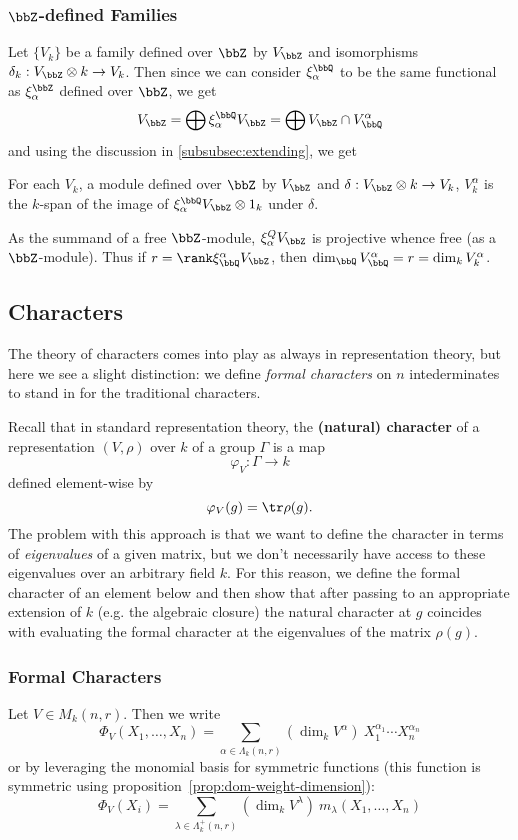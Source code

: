 \documentclass[12pt]{article}
\DeclareMathOperator{\1}{\mathbbm{1}}
\begin{document}
{\subsubsection{\texorpdfstring{$\bbZ$}{Z}-defined Families}
Let $\{V_k\}$ be a family defined over $\bbZ$ by $V_\bbZ$ and isomorphisms $\delta_k:V_\bbZ\otimes k\to V_k$. Then since we can consider $\xi_\alpha^\bbQ$ 
to be the same functional as $\xi_\alpha^\bbZ$ defined over $\bbZ$, we get 
\[V_\bbZ=\bigoplus \xi_\alpha^\bbQ V_\bbZ=\bigoplus V_\bbZ\cap V_\bbQ^\alpha\]
and using the discussion in \ref{subsubsec:extending}, we get 
\begin{prop}
	For each $V_k$, a module defined over $\bbZ$ by $V_\bbZ$ and $\delta:V_\bbZ\otimes k\to V_k$,
	$V_k^\alpha$ is the $k$-span of the image of $\xi_\alpha^\bbQ V_\bbZ\otimes 1_k$ under $\delta$.
\end{prop}
\begin{rmk}
	As the summand of a free $\bbZ$-module, $\xi_\alpha^Q V_\bbZ$ is projective whence free (as a $\bbZ$-module). Thus if $r=\rank \xi_\bbQ^\alpha V_\bbZ$, 
	then $\dim_\bbQ V_\bbQ^\alpha=r=\dim_k V_k^\alpha$.
\end{rmk}

\subsection{Characters}
The theory of characters comes into play as always in representation theory, but here we see a slight distinction:
we define \textit{formal characters} on $n$ intederminates to stand in for the traditional characters.

Recall that in standard representation theory, the \textbf{(natural) character} of a representation $(V,\rho)$ over $k$ of a group $\Gamma$ is a map 
\[\varphi_V:\Gamma\to k\]
defined element-wise by 
\[\varphi_V(g)=\tr \rho(g).\]
The problem with this approach is that we want to define the character in terms of \textit{eigenvalues} of a given matrix, 
but we don't necessarily have access to these eigenvalues over an arbitrary field $k$. For this reason, we define 
the formal character of an element below and then show that after passing to an appropriate extension of $k$ (e.g. the algebraic closure)
the natural character at $g$ coincides with evaluating the formal character at the eigenvalues of the matrix $\rho(g)$.

\subsubsection{Formal Characters}
Let $V\in M_k(n,r)$. Then we write 
\[\Phi_V(X_1,\dots, X_n)=\sum_{\alpha\in\Lambda_k(n,r)}(\dim_k V^\alpha) \ X_1^{\alpha_1}\cdots X_n^{\alpha_n}\]
or by leveraging the monomial basis for symmetric functions (this function is symmetric using proposition~\ref{prop:dom-weight-dimension}):
\[\Phi_V(X_i)=\sum_{\lambda\in\Lambda^+_k(n,r)}(\dim_kV^\lambda)\ m_\lambda(X_1,\dots,X_n)\]

}
\end{document}
